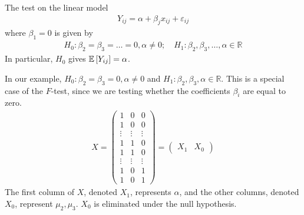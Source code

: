 
\begin{definition}
	The  test on the linear model
	\begin{align*}
		Y_{ij} = \alpha + \beta_j x_{ij} + \varepsilon_{ij}
	\end{align*}
	where $\beta_1 = 0$ is given by
	\begin{align*}
		H_0 \colon \beta_2 = \beta_3 = \dots = 0, \alpha \neq 0;\quad H_1 \colon \beta_2, \beta_3, \dots, \alpha \in \mathbb R
	\end{align*}
	In particular, $H_0$ gives $\mathbb{E}\left[{Y_{ij}}\right] = \alpha$.
\end{definition}

In our example, $H_0 \colon \beta_2 = \beta_3 = 0, \alpha \neq 0$ and $H_1 \colon \beta_2, \beta_3, \alpha \in \mathbb R$.
This is a special case of the $F$-test, since we are testing whether the coefficients $\beta_i$ are equal to zero.
\begin{align*}
	X = \begin{pmatrix}
		1      & 0      & 0      \\
		1      & 0      & 0      \\
		\vdots & \vdots & \vdots \\
		1      & 1      & 0      \\
		1      & 1      & 0      \\
		\vdots & \vdots & \vdots \\
		1      & 0      & 1      \\
		1      & 0      & 1
	\end{pmatrix} = \begin{pmatrix}
		X_1 & X_0
	\end{pmatrix}
\end{align*}
The first column of $X$, denoted $X_1$, represents $\alpha$, and the other columns, denoted $X_0$, represent $\mu_2, \mu_3$.
$X_0$ is eliminated under the null hypothesis.

